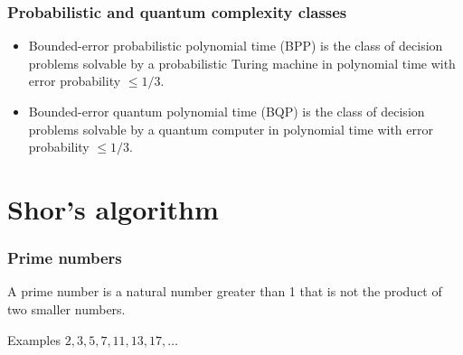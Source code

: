 	
	\begin{frame}
		\frametitle{Probabilistic and quantum complexity classes}
		
		\begin{itemize}
			\item Bounded-error probabilistic polynomial time (\alert{BPP}) is the class of decision problems solvable by a probabilistic Turing machine in polynomial time with error probability $\le 1/3$.
			\item Bounded-error quantum polynomial time (\alert{BQP}) is the class of decision problems solvable by a quantum computer in polynomial time with error probability $\le 1/3$.
		\end{itemize}
		
		\begin{center}
		\end{center}
		
	\end{frame}
	
	\section{Shor's algorithm}
	
	\begin{frame}
		\frametitle{Prime numbers}
		
		\begin{definition}
			A \alert{prime number} is a natural number greater than 1 that is not the product of two smaller numbers.
		\end{definition}
		\begin{block}{Examples}
			$2, 3, 5, 7, 11, 13, 17, \dots$
		\end{block}
	\end{frame}
	
